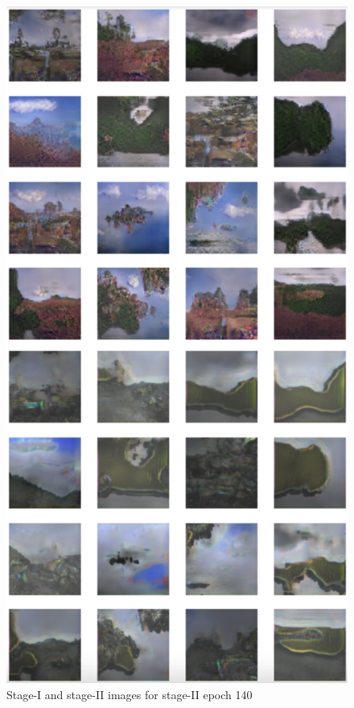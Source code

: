 \documentclass{article}
\begin{document}
	\begin{figure}[h]
	\centering
	\includegraphics[scale=0.6]{images/epoch140_FID423.png}
	\caption{Stage-I and stage-II images for stage-II epoch 140}
	\end{figure}
\end{document}
